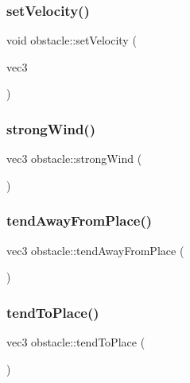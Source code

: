 \mbox{\label{classobstacle_adfe6fe1978d265084184e0f3e4c4b97b}} 
\subsubsection{\texorpdfstring{set\+Velocity()}{setVelocity()}}
{\footnotesize\ttfamily void obstacle\+::set\+Velocity (\begin{DoxyParamCaption}\item[{vec3}]{ }\end{DoxyParamCaption})}

\mbox{\label{classobstacle_aefbfa049ac32d9bf938e8abd3660d650}} 
\subsubsection{\texorpdfstring{strong\+Wind()}{strongWind()}}
{\footnotesize\ttfamily vec3 obstacle\+::strong\+Wind (\begin{DoxyParamCaption}{ }\end{DoxyParamCaption})}

\mbox{\label{classobstacle_a791873b051c097fe6df330bf7b723555}} 
\subsubsection{\texorpdfstring{tend\+Away\+From\+Place()}{tendAwayFromPlace()}}
{\footnotesize\ttfamily vec3 obstacle\+::tend\+Away\+From\+Place (\begin{DoxyParamCaption}{ }\end{DoxyParamCaption})}

\mbox{\label{classobstacle_aaee06f5eb44efbe0ed7ea035eeb86d38}} 
\subsubsection{\texorpdfstring{tend\+To\+Place()}{tendToPlace()}}
{\footnotesize\ttfamily vec3 obstacle\+::tend\+To\+Place (\begin{DoxyParamCaption}{ }\end{DoxyParamCaption})}

